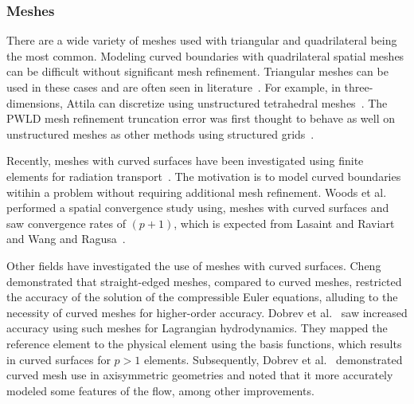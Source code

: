 \documentclass{article}
\begin{document}


\subsubsection{Meshes}

There are a wide variety of meshes used with triangular and quadrilateral being the most common. Modeling curved boundaries with quadrilateral spatial meshes can be difficult without significant mesh refinement. Triangular meshes can be used in these cases and are often seen in literature~\cite{ReedTriangularMesh,WangHODGTransport,WangDGFEMConvergence, MorelLLDrz}. For example, in three-dimensions, Attila can discretize using unstructured tetrahedral meshes~\cite{WareingAttila}. The PWLD mesh refinement truncation error was first thought to behave as well on unstructured meshes as other methods using structured grids~\cite{StonePLFEM}.

Recently, meshes with curved surfaces have been investigated using finite elements for radiation transport~\cite{WoodsHoDgfemXyCurved,WoodsThesis}. The motivation is to model curved boundaries witihin a problem without requiring additional mesh refinement. Woods et al.~\cite{WoodsHoDgfemXyCurved} performed a spatial convergence study using, meshes with curved surfaces and saw convergence rates of $(p+1)$, which is expected from Lasaint and Raviart~\cite{LasaintFEM} and Wang and Ragusa~\cite{WangHODGTransport}.


Other fields have investigated the use of meshes with curved surfaces. Cheng~\cite{ChengCurvMeshEulerEqs} demonstrated that straight-edged meshes, compared to curved meshes, restricted the accuracy of the solution of the compressible Euler equations, alluding to the necessity of curved meshes for higher-order accuracy. Dobrev et al.~\cite{DobrevHOFEMHydro} saw increased accuracy using such meshes for Lagrangian hydrodynamics. They mapped the reference element to the physical element using the basis functions, which results in curved surfaces for $p>1$ elements. Subsequently, Dobrev et al.~\cite{DobrevHOAxisymmetric} demonstrated curved mesh use in axisymmetric geometries and noted that it more accurately modeled some features of the flow, among other improvements.
\end{document}
